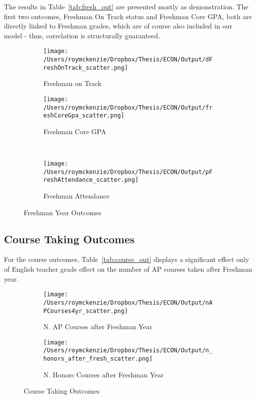 \documentclass[../thesis_main.tex]{subfiles}
\begin{document}
The results in Table~\ref{tab:fresh_out} are presented mostly as demonstration. The first two outcomes, Freshman On Track status and Freshman Core GPA, both are directly linked to Freshman grades, which are of course also included in our model - thus, correlation is structurally guaranteed. 



\begin{figure}
     \centering
     \begin{subfigure}[b]{0.4\textwidth}
         \centering
         \texttt{[image: /Users/roymckenzie/Dropbox/Thesis/ECON/Output/dFreshOnTrack\_scatter.png]}
         \caption{Freshman on Track}
         \label{fig:dFreshOnTrack}
     \end{subfigure}
     \hfill
     \begin{subfigure}[b]{0.4\textwidth}
         \centering
         \texttt{[image: /Users/roymckenzie/Dropbox/Thesis/ECON/Output/freshCoreGpa\_scatter.png]}
         \caption{Freshman Core GPA}
         \label{fig:freshCoreGpa}
     \end{subfigure}\\

     \begin{subfigure}[b]{0.4\textwidth}
         \centering
         \texttt{[image: /Users/roymckenzie/Dropbox/Thesis/ECON/Output/pFreshAttendance\_scatter.png]}
         \caption{Freshman Attendance}
         \label{fig:pFreshAttendance}
     \end{subfigure}
        \caption{Freshman Year Outcomes}
        \label{fig:fresh}
\end{figure}

\subsection*{Course Taking Outcomes}

For the course outcomes, Table~\ref{tab:course_out} displays a significant effect only of English teacher grade effect on the number of AP courses taken after Freshman year. 



\begin{figure}
     \centering
     \begin{subfigure}[b]{0.45\textwidth}
         \centering
         \texttt{[image: /Users/roymckenzie/Dropbox/Thesis/ECON/Output/nAPCourses4yr\_scatter.png]}
         \caption{N. AP Courses after Freshman Year}
         \label{fig:nAPCourses4yr}
     \end{subfigure}
     \hfill
     \begin{subfigure}[b]{0.45\textwidth}
         \centering
         \texttt{[image: /Users/roymckenzie/Dropbox/Thesis/ECON/Output/n\_honors\_after\_fresh\_scatter.png]}
         \caption{N. Honors Courses after Freshman Year}
         \label{fig:freshCoreGpa}
     \end{subfigure}
      \caption{Course Taking Outcomes}
      \label{fig:course}
\end{figure}
\end{document}
